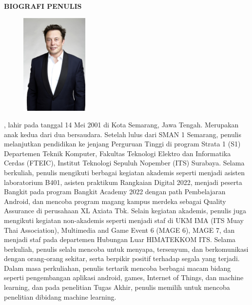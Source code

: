 \begin{center}
  \Large
  \textbf{BIOGRAFI PENULIS}
\end{center}


\vspace{2ex}

\begin{figure}
  \centering
  \vspace{-3ex}
  \includegraphics[width=0.3\textwidth]{gambar/elon.jpg}
  \vspace{-4ex}
\end{figure}

\name{}, lahir pada tanggal 14 Mei 2001 di Kota Semarang, Jawa Tengah. Merupakan anak kedua dari 
dua bersaudara. Setelah lulus dari SMAN 1 Semarang, penulis melanjutkan pendidikan ke jenjang 
Perguruan Tinggi di program Strata 1 (S1) Departemen Teknik Komputer, Fakultas Teknologi Elektro 
dan Informatika Cerdas (FTEIC), Institut Teknologi Sepuluh Nopember (ITS) Surabaya. Selama berkuliah, 
penulis mengikuti berbagai kegiatan akademis seperti menjadi asisten laboratorium B401, asisten 
praktikum Rangkaian Digital 2022, menjadi peserta Bangkit pada program Bangkit Academy 2022 dengan path 
Pembelajaran Android, dan mencoba program magang kampus merdeka sebagai Quality Assurance di perusahaan 
XL Axiata Tbk. Selain kegiatan akademis, penulis juga mengikuti kegiatan non-akademis seperti menjadi 
staf di UKM IMA (ITS Muay Thai Association), Multimedia and Game Event 6 (MAGE 6), MAGE 7, dan menjadi 
staf pada departemen Hubungan Luar HIMATEKKOM ITS. Selama berkuliah, penulis selalu mencoba untuk menyapa, 
tersenyum, dan berkomunikasi dengan orang-orang sekitar, serta berpikir positif terhadap segala yang terjadi. 
Dalam masa perkuliahan, penulis tertarik mencoba berbagai macam bidang seperti pengembangan aplikasi android, 
games, Internet of Things, dan machine learning, dan pada penelitian Tugas Akhir, penulis memilih untuk 
mencoba penelitian dibidang machine learning.
